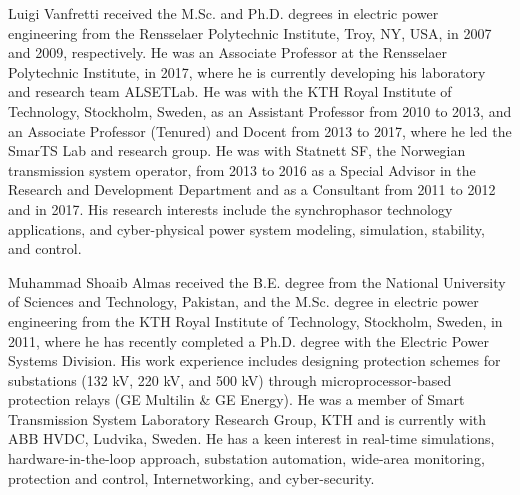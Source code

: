 \documentclass{ieeeaccess}
\begin{document}
\begin{IEEEbiography}{Luigi Vanfretti}
 received the M.Sc. and Ph.D. degrees in electric power engineering from the Rensselaer Polytechnic Institute, Troy, NY, USA, in 2007 and 2009, respectively. He was an Associate Professor at the Rensselaer Polytechnic Institute, in 2017, where he is currently developing his laboratory and research team ALSETLab. He was with the KTH Royal Institute of Technology, Stockholm, Sweden, as an Assistant Professor from 2010 to 2013, and an Associate Professor (Tenured) and Docent from 2013 to 2017, where he led the SmarTS Lab and research group. He was with Statnett SF, the Norwegian transmission system operator, from 2013 to 2016 as a Special Advisor in the Research and Development Department and as a Consultant from 2011 to 2012 and in 2017. His research interests include the synchrophasor technology applications, and cyber-physical power system modeling, simulation, stability, and control. 
\end{IEEEbiography}

\begin{IEEEbiography}{Muhammad Shoaib Almas}
received the B.E. degree from the National University of Sciences and Technology, Pakistan, and the M.Sc. degree in electric power engineering from the KTH Royal Institute of Technology, Stockholm, Sweden, in 2011, where he has recently completed a Ph.D. degree with the Electric Power Systems Division. His work experience includes designing protection schemes for substations (132 kV, 220 kV, and 500 kV) through microprocessor-based protection relays (GE Multilin \& GE Energy). He was a member of Smart Transmission System Laboratory Research Group, KTH and is currently with ABB HVDC, Ludvika, Sweden. He has a keen interest in real-time simulations, hardware-in-the-loop approach, substation automation, wide-area monitoring, protection and control, Internetworking, and cyber-security. 
\end{IEEEbiography}

\EOD
\end{document}
